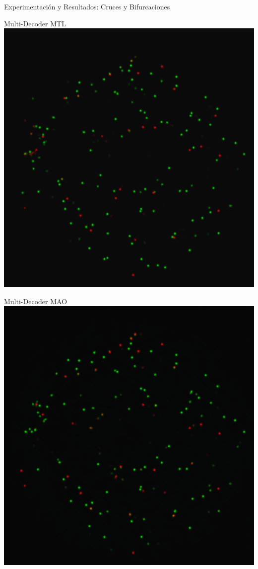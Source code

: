 \documentclass[xcolor=dvipsnames,table]{beamer}
\begin{document}
\begin{frame}{Experimentación y Resultados: Cruces y Bifurcaciones}
\begin{minipage}[b]{0.13\textwidth}
	\end{minipage}\hfill
	\begin{minipage}[b]{0.13\textwidth}
		\centering
		Multi-Decoder MTL\\[0.2cm]
		\includegraphics[width=\linewidth]{my_images/video/XBMULTIMTL.jpg}
	\end{minipage}\hfill
	\begin{minipage}[b]{0.13\textwidth}
		\centering
		Multi-Decoder MAO\\[0.2cm]
		\includegraphics[width=\linewidth]{my_images/video/XBMULTIMAO.jpg}
	\end{minipage}
\end{frame}
\end{document}
